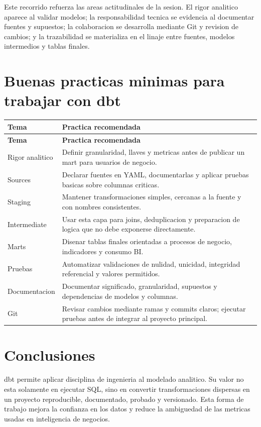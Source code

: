 \documentclass[12pt]{article}
\begin{document}
Este recorrido refuerza las areas actitudinales de la sesion. El rigor analitico aparece al validar modelos; la responsabilidad tecnica se evidencia al documentar fuentes y supuestos; la colaboracion se desarrolla mediante Git y revision de cambios; y la trazabilidad se materializa en el linaje entre fuentes, modelos intermedios y tablas finales.

\section{Buenas practicas minimas para trabajar con dbt}
\begin{longtable}{@{}p{}p{}@{}}
\toprule
\textbf{Tema} & \textbf{Practica recomendada} \\
\midrule
\endfirsthead
\toprule
\textbf{Tema} & \textbf{Practica recomendada} \\
\midrule
\endhead

Rigor analitico & Definir granularidad, llaves y metricas antes de publicar un mart para usuarios de negocio. \\

Sources & Declarar fuentes en YAML, documentarlas y aplicar pruebas basicas sobre columnas criticas. \\

Staging & Mantener transformaciones simples, cercanas a la fuente y con nombres consistentes. \\

Intermediate & Usar esta capa para joins, deduplicacion y preparacion de logica que no debe exponerse directamente. \\

Marts & Disenar tablas finales orientadas a procesos de negocio, indicadores y consumo BI. \\

Pruebas & Automatizar validaciones de nulidad, unicidad, integridad referencial y valores permitidos. \\

Documentacion & Documentar significado, granularidad, supuestos y dependencias de modelos y columnas. \\

Git & Revisar cambios mediante ramas y commits claros; ejecutar pruebas antes de integrar al proyecto principal. \\

\bottomrule
\end{longtable}

\section{Conclusiones}
dbt permite aplicar disciplina de ingenieria al modelado analitico. Su valor no esta solamente en ejecutar SQL, sino en convertir transformaciones dispersas en un proyecto reproducible, documentado, probado y versionado. Esta forma de trabajo mejora la confianza en los datos y reduce la ambiguedad de las metricas usadas en inteligencia de negocios.
\end{document}
